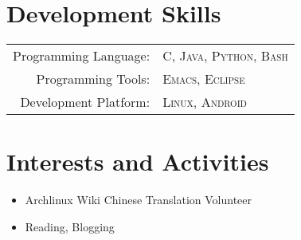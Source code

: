 \documentclass[a4paper,10pt]{article} %
\begin{document}

\section{Development Skills}

\begin{tabular}{rl}
Programming Language: & \textsc{C}, \textsc{Java}, \textsc{Python}, \textsc{Bash}\setmainfont{Verdana}\\
Programming Tools: & \textsc{Emacs}, \textsc{Eclipse}\\
Development Platform: & \textsc{Linux}, \textsc{Android}
\end{tabular}


\section{Interests and Activities}

\begin{itemize}
\item Archlinux Wiki Chinese Translation Volunteer
\item Reading, Blogging
\end{itemize}



\end{document}
